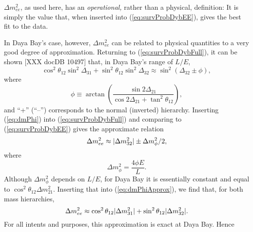 \documentclass[../thesis.tex]{subfiles}
\begin{document}
\(\Delta m^2_{ee}\), as used here, has an \emph{operational,} rather than a
physical, definition: It is simply the value that, when inserted into
(\ref{eq:survProbDybEE}), gives the best fit to the data.
%
\begin{comment}
  Note that, if Daya Bay only measured antineutrinos at a single $L/E$, we could
  instead have made a truly physical definition of $\Delta m^2_{ee}$ by
  declaring that \[ \sin^2 \Delta_{ee} \equiv \cos^2\theta_{12} \sin^2
    \Delta_{31} + \sin^2\theta_{12} \sin^2 \Delta_{32}. \] However, the
  righthand side of this definition depends on $L/E$, so unless this dependence
  is shown to be negligible, it cannot be used in broadband analyses such as
  Daya Bay's.
\end{comment}
%
In Daya Bay's case, however, \(\Delta m^2_{ee}\) can be related to physical
quantities to a very good degree of approximation. Returning to
(\ref{eq:survProbDybFull}), it can be shown [XXX docDB 10497] that, in Daya
Bay's range of $L/E$,
\begin{equation}
  \label{eq:dmPhi}
  \cos^2\theta_{12} \sin^2\Delta_{31} + \sin^2\theta_{12}\sin^2\Delta_{32}
  \approx \sin^2 (\Delta_{32} \pm \phi),
\end{equation}
where
\begin{equation*}
  \phi \equiv \arctan\left( \frac{\sin2\Delta_{21}}{\cos2\Delta_{21}+ \tan^2
      \theta_{12}} \right),
\end{equation*}
and ``+'' (``--'') corresponds to the normal (inverted) hierarchy. Inserting
(\ref{eq:dmPhi}) into (\ref{eq:survProbDybFull}) and comparing to
(\ref{eq:survProbDybEE}) gives the approximate relation
\begin{equation}
  \label{eq:dmPhiApprox}
  \Delta m^2_{ee} \approx \lvert \Delta m^2_{32}\rvert \pm \Delta m^2_\phi/2,
\end{equation}
where
\begin{equation*}
  \Delta m^2_\phi = \frac{4\phi E}{L}.
\end{equation*}
Although $\Delta m^2_\phi$ depends on $L/E$, for Daya Bay it is essentially
constant and equal to \(\cos^2\theta_{12}\Delta m^2_{21}\). Inserting that into
(\ref{eq:dmPhiApprox}), we find that, for both mass hierarchies,
\begin{equation}
  \label{eq:dmPhysical}
  \Delta m^2_{ee} \approx \cos^2\theta_{12}\lvert \Delta m^2_{31}\rvert + \sin^2\theta_{12}\lvert \Delta m^2_{32}\rvert.
\end{equation}
For all intents and purposes, this approximation is exact at Daya Bay. Hence
\end{document}
